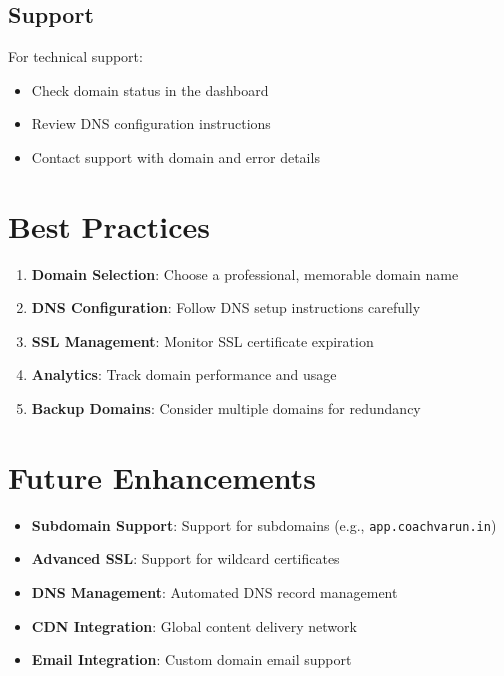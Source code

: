 \documentclass[12pt,a4paper]{article}
\begin{document}
\subsection{Support}

For technical support:
\begin{itemize}
    \item Check domain status in the dashboard
    \item Review DNS configuration instructions
    \item Contact support with domain and error details
\end{itemize}

\section{Best Practices}

\begin{enumerate}
    \item \textbf{Domain Selection}: Choose a professional, memorable domain name
    \item \textbf{DNS Configuration}: Follow DNS setup instructions carefully
    \item \textbf{SSL Management}: Monitor SSL certificate expiration
    \item \textbf{Analytics}: Track domain performance and usage
    \item \textbf{Backup Domains}: Consider multiple domains for redundancy
\end{enumerate}

\section{Future Enhancements}

\begin{itemize}
    \item \textbf{Subdomain Support}: Support for subdomains (e.g., \texttt{app.coachvarun.in})
    \item \textbf{Advanced SSL}: Support for wildcard certificates
    \item \textbf{DNS Management}: Automated DNS record management
    \item \textbf{CDN Integration}: Global content delivery network
    \item \textbf{Email Integration}: Custom domain email support
\end{itemize}
\end{document}
